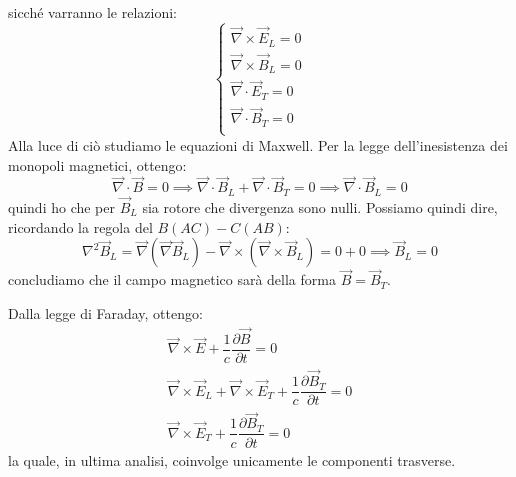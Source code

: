 sicché varranno le relazioni:
\begin{equation}
\begin{cases}
  \Vec{\nabla}\times\Vec{E}_L=0\\
  \Vec{\nabla}\times\Vec{B}_L=0\\
  \Vec{\nabla}\cdot\Vec{E}_T=0\\
  \Vec{\nabla}\cdot\Vec{B}_T=0\\
\end{cases}
\end{equation}
Alla luce di ciò studiamo le equazioni di Maxwell.
Per la legge dell'inesistenza dei monopoli magnetici, ottengo:
\begin{equation*}
    \Vec{\nabla}\cdot\Vec{B}=0\implies\Vec{\nabla}\cdot\Vec{B}_L+\Vec{\nabla}\cdot\Vec{B}_T=0 \implies\Vec{\nabla}\cdot\Vec{B}_L=0
\end{equation*}
quindi ho che per $\Vec{B}_L$ sia rotore che divergenza sono nulli. Possiamo quindi dire, ricordando la regola del $B(AC)-C(AB)$:
\begin{equation*}
    \nabla^2 \Vec{B}_L=\Vec{\nabla}(\Vec{\nabla}\Vec{B}_L)-\Vec{\nabla}\times(\Vec{\nabla}\times\Vec{B}_L)=0+0 \implies \Vec{B}_L=0
\end{equation*}
concludiamo che il campo magnetico sarà della forma $\Vec{B}=\Vec{B}_T$.

Dalla legge di Faraday, ottengo:
\begin{equation*}
\begin{gathered}
\Vec{\nabla}\times\Vec{E}+\dfrac{1}{c}\dfrac{\partial\Vec{B}}{\partial t} =0\\
\Vec{\nabla}\times\Vec{E}_L+\Vec{\nabla}\times\Vec{E}_T+\dfrac{1}{c}\dfrac{\partial\Vec{B}_T}{\partial t} =0\\
\Vec{\nabla}\times\Vec{E}_T+\dfrac{1}{c}\dfrac{\partial\Vec{B}_T}{\partial t} =0
\end{gathered}
\end{equation*}
la quale, in ultima analisi, coinvolge unicamente le componenti trasverse.

